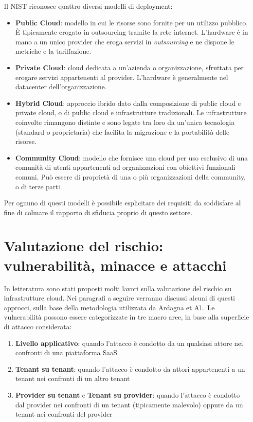 \documentclass[../main.tex]{subfiles}
\begin{document}
Il NIST \cite{NISTCloud} riconosce quattro diversi modelli di deployment:
\begin{itemize}
    \item \textbf{Public Cloud}: modello in cui le risorse sono fornite per un utilizzo pubblico. È tipicamente erogato in outsourcing tramite la rete internet. L'hardware è in mano a un unico provider che eroga servizi in \textit{outsourcing} e ne dispone le metriche e la tariffazione.
    \item \textbf{Private Cloud}: cloud dedicata a un'azienda o organizzazione, sfruttata per erogare servizi appartenenti al provider. L'hardware è generalmente nel datacenter dell'organizzazione.
    \item \textbf{Hybrid Cloud}: approccio ibrido dato dalla composizione di public cloud e private cloud, o di public cloud e infrastrutture tradizionali. Le infrastrutture coinvolte rimangono distinte e sono legate tra loro da un'unica tecnologia (standard o proprietaria) che facilita la migrazione e la portabilità delle risorse.
    \item \textbf{Community Cloud}: modello che fornisce una cloud per uso esclusivo di una comunità di utenti appartenenti ad organizzazioni con obiettivi funzionali comuni. Può essere di proprietà di una o più organizzazioni della community, o di terze parti.
\end{itemize}
Per ognuno di questi modelli è possibile esplicitare dei requisiti da soddisfare al fine di colmare il rapporto di sfiducia proprio di questo settore\cite{Ardagna:2015:SAC:2808687.2767005}.

\section{Valutazione del rischio: vulnerabilità, minacce e attacchi}
In letteratura sono stati proposti molti lavori sulla valutazione del rischio su infrastrutture cloud. Nei paragrafi a seguire verranno discussi alcuni di questi approcci, sulla base della metodologia utilizzata da Ardagna et Al.\cite{Ardagna:2015:SAC:2808687.2767005}.
Le vulnerabilità possono essere categorizzate in tre macro aree, in base alla superficie di attacco considerata:
\begin{enumerate}
    \item \textbf{Livello applicativo}: quando l'attacco è condotto da un qualsiasi attore nei confronti di una piattaforma SaaS
    \item \textbf{Tenant su tenant}: quando l'attacco è condotto da attori appartenenti a un tenant nei confronti di un altro tenant
    \item \textbf{Provider su tenant} e \textbf{Tenant su provider}: quando l'attacco è condotto dal provider nei confronti di un tenant (tipicamente malevolo) oppure da un tenant nei confronti del provider 
\end{enumerate}
\end{document}
